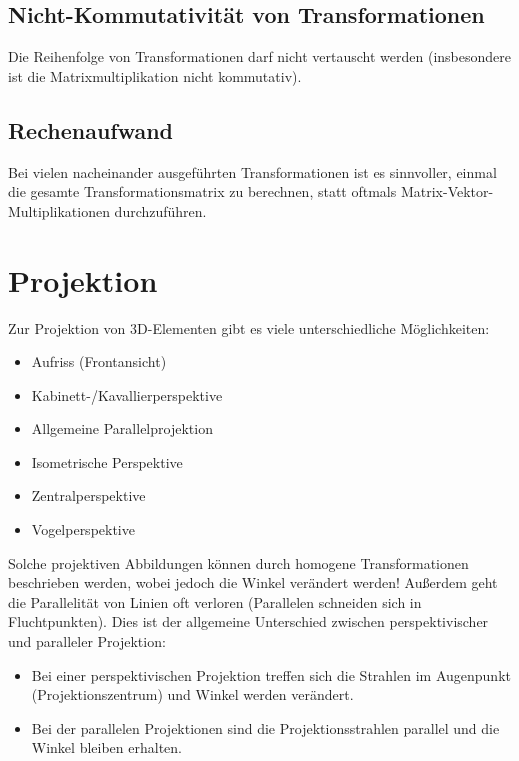 		\subsection{Nicht-Kommutativität von Transformationen}
			Die Reihenfolge von Transformationen darf \iA nicht vertauscht werden (insbesondere ist die Matrixmultiplikation nicht kommutativ).

		\subsection{Rechenaufwand}
			Bei vielen nacheinander ausgeführten Transformationen ist es sinnvoller, einmal die gesamte Transformationsmatrix zu berechnen, statt oftmals Matrix-Vektor-Multiplikationen durchzuführen.

	\section{Projektion}
		\label{sec:projection}
		
		Zur Projektion von 3D-Elementen gibt es viele unterschiedliche Möglichkeiten:
		\begin{itemize}
			\item Aufriss (Frontansicht)
			\item Kabinett-/Kavallierperspektive
			\item Allgemeine Parallelprojektion
			\item Isometrische Perspektive
			\item Zentralperspektive
			\item Vogelperspektive
		\end{itemize}
	
		Solche projektiven Abbildungen können durch homogene Transformationen beschrieben werden, wobei jedoch die Winkel verändert werden! Außerdem geht die Parallelität von Linien oft verloren (\dh Parallelen schneiden sich in Fluchtpunkten). Dies ist der allgemeine Unterschied zwischen perspektivischer und paralleler Projektion:
		\begin{itemize}
			\item Bei einer perspektivischen Projektion treffen sich die Strahlen im Augenpunkt (Projektionszentrum) und Winkel werden verändert.
			\item Bei der parallelen Projektionen sind die Projektionsstrahlen parallel und die Winkel bleiben erhalten.
		\end{itemize}


